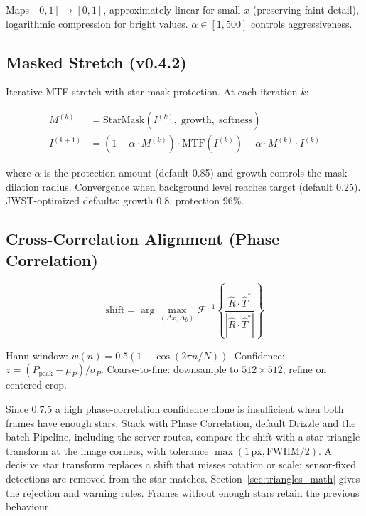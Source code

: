 \documentclass[11pt,a4paper]{article}
\begin{document}
    Maps $[0, 1] \to [0, 1]$, approximately linear for small $x$ (preserving faint detail), logarithmic compression for bright values. $\alpha \in [1, 500]$ controls aggressiveness.

    \subsection{Masked Stretch (v0.4.2)}
    \label{sec:masked_stretch}

    Iterative MTF stretch with star mask protection. At each iteration $k$:

    \begin{align}
        M^{(k)} &= \text{StarMask}(I^{(k)},\; \text{growth},\; \text{softness}) \\
        I^{(k+1)} &= (1 - \alpha \cdot M^{(k)}) \cdot \text{MTF}(I^{(k)}) + \alpha \cdot M^{(k)} \cdot I^{(k)}
    \end{align}

    where $\alpha$ is the protection amount (default 0.85) and growth controls the mask dilation radius. Convergence when background level reaches target (default 0.25). JWST-optimized defaults: growth 0.8, protection 96\%.

    \subsection{Cross-Correlation Alignment (Phase Correlation)}
    \label{sec:alignment_phase}

    \begin{equation}
        \text{shift} = \arg\max_{(\Delta x, \Delta y)} \mathcal{F}^{-1}\!\left\{\frac{\hat{R} \cdot \hat{T}^*}{|\hat{R} \cdot \hat{T}^*|}\right\}
        \label{eq:phase_corr}
    \end{equation}

    Hann window: $w(n) = 0.5(1 - \cos(2\pi n / N))$. Confidence: $z = (P_{\text{peak}} - \mu_P) / \sigma_P$. Coarse-to-fine: downsample to $512 \times 512$, refine on centered crop.

    Since 0.7.5 a high phase-correlation confidence alone is insufficient when both frames have enough stars. Stack with Phase Correlation, default Drizzle and the batch Pipeline, including the server routes, compare the shift with a star-triangle transform at the image corners, with tolerance $\max(1\,\mathrm{px},\mathrm{FWHM}/2)$. A decisive star transform replaces a shift that misses rotation or scale; sensor-fixed detections are removed from the star matches. Section~\ref{sec:triangles_math} gives the rejection and warning rules. Frames without enough stars retain the previous behaviour.
\end{document}
